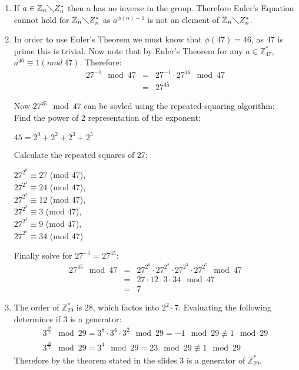 \begin{enumerate}
    \item If $a \in \mathbb{Z}_{n}\mathbb\diagdown{Z}^{*}_{n}$ then a has no inverse in the group. Therefore Euler's Equation cannot hold for $\mathbb{Z}_{n}\mathbb\diagdown{Z}^{*}_{n}$ as $a^{\phi(n) - 1}$ is not an element of $\mathbb{Z}_{n}\mathbb\diagdown{Z}^{*}_{n}$.

    \item In order to use Euler's Theorem we must know that $\phi(47) = 46$, as 
    47 is prime this is trivial. Now note that by Euler's Theorem for any $a \in
     \mathbb{Z}^{*}_{47}$,\\ $a^{46} \equiv 1 (mod\ 47)$. Therefore:
    \begin{eqnarray*}
        27^{-1} \mod 47 &=& 27^{-1} \cdot 27^{46} \mod 47 \\
        &=& 27^{45}
    \end{eqnarray*}

    Now $27^{45} \mod 47$ can be sovled using the repeated-squaring algorithm: \\
    Find the power of 2 representation of the exponent:
    \begin{center}
        $45 = 2^{0} + 2^{2} + 2^{3} + 2^{5}$
    \end{center}

    Calculate the repeated squares of 27:
    \begin{center}
        $27^{2^{0}} \equiv 27$ (mod 47), \\
        $27^{2^{1}} \equiv 24$ (mod 47), \\
        $27^{2^{2}} \equiv 12$ (mod 47), \\
        $27^{2^{3}} \equiv 3$ (mod 47), \\
        $27^{2^{4}} \equiv 9$ (mod 47), \\
        $27^{2^{5}} \equiv 34$ (mod 47)
    \end{center}

    Finally solve for $27^{-1} = 27^{45}$:
    \begin{eqnarray*}
        27^{45} \mod 47 &=& 27^{2^{0}} \cdot 27^{2^{2}} \cdot 27^{2^{3}} \cdot 27^{2^{5}} \mod 47 \\
        &=& 27 \cdot 12 \cdot 3 \cdot 34 \mod 47 \\
        &=& 7
    \end{eqnarray*}

    \item The order of $\mathbb{Z}^{*}_{29}$ is 28, which factos into $2^{2} \cdot 7$. Evaluating the following determines if 3 is a generator:
    \begin{eqnarray*}
        3^{\frac{28}{2}} \mod 29 = 3^{8} \cdot 3^{4} \cdot 3^{2} \mod 29 = -1 \mod 29 \not\equiv 1 \mod 29 \\
        3^{\frac{28}{7}} \mod 29 = 3^{4} \mod 29 = 23 \mod 29 \not\equiv 1 \mod 29
    \end{eqnarray*}
    Therefore by the theorem stated in the slides\cite{Slides_70} 3 is a generator of $\mathbb{Z}^{*}_{29}$.

\end{enumerate}